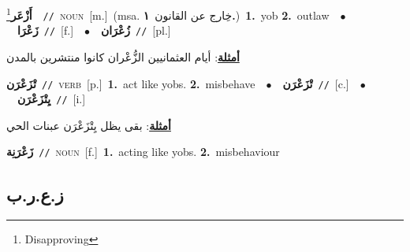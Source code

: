 \documentclass[10pt,a4paper,twoside]{article} %
\begin{document}
\begin{multicols}{2}
{\setlength\topsep{0pt}\textbf{\foreignlanguage{arabic}{أَزْعَر}}\footnote{Disapproving}\ \ {\color{gray}\texttt{//}\color{black}}\ \textsc{noun}\ [m.]\ \color{gray}(msa. \foreignlanguage{arabic}{خِارج عن القانون}~\foreignlanguage{arabic}{\textbf{١.}})\color{black}\ \textbf{1.}~yob  \textbf{2.}~outlaw\ \ $\bullet$\ \ \setlength\topsep{0pt}\textbf{\foreignlanguage{arabic}{زَعْرَا}}\ {\color{gray}\texttt{//}\color{black}}\ [f.]\ \ $\bullet$\ \ \setlength\topsep{0pt}\textbf{\foreignlanguage{arabic}{زُعْرَان}}\ {\color{gray}\texttt{//}\color{black}}\ [pl.]\  \begin{flushright}\color{gray}\foreignlanguage{arabic}{\textbf{\underline{\foreignlanguage{arabic}{أمثلة}}}: أيام العثمانيين الزُّعْران كانوا منتشرين بالمدن}\end{flushright}\color{black}} \vspace{2mm}

{\setlength\topsep{0pt}\textbf{\foreignlanguage{arabic}{تْزَعْرَن}}\ {\color{gray}\texttt{//}\color{black}}\ \textsc{verb}\ [p.]\ \textbf{1.}~act like yobs.  \textbf{2.}~misbehave\ \ $\bullet$\ \ \setlength\topsep{0pt}\textbf{\foreignlanguage{arabic}{تْزَعْرَن}}\ {\color{gray}\texttt{//}\color{black}}\ [c.]\ \ $\bullet$\ \ \setlength\topsep{0pt}\textbf{\foreignlanguage{arabic}{يِتْزَعْرَن}}\ {\color{gray}\texttt{//}\color{black}}\ [i.]\  \begin{flushright}\color{gray}\foreignlanguage{arabic}{\textbf{\underline{\foreignlanguage{arabic}{أمثلة}}}: بقى يظل يِتْزَعْرَن عبنات الحي}\end{flushright}\color{black}} \vspace{2mm}

{\setlength\topsep{0pt}\textbf{\foreignlanguage{arabic}{زَعْرَنِة}}\ {\color{gray}\texttt{//}\color{black}}\ \textsc{noun}\ [f.]\ \textbf{1.}~acting like yobs.  \textbf{2.}~misbehaviour\ } \vspace{2mm}

\vspace{-3mm}
\subsection*{\color{blue}\foreignlanguage{arabic}{ز.ع.ر.ب}\color{blue}{}} 


\end{multicols}
\end{document}
